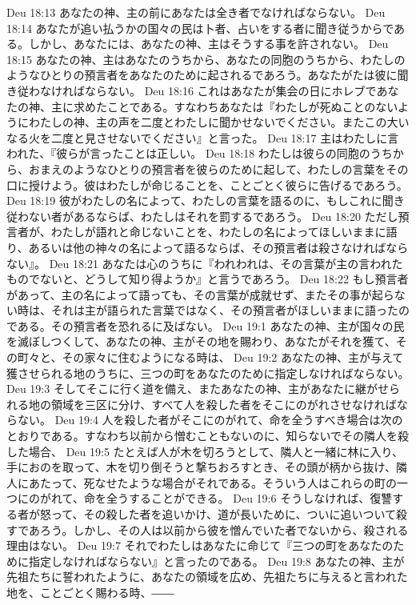 Deu 18:13  あなたの神、主の前にあなたは全き者でなければならない。
Deu 18:14  あなたが追い払うかの国々の民は卜者、占いをする者に聞き従うからである。しかし、あなたには、あなたの神、主はそうする事を許されない。
Deu 18:15  あなたの神、主はあなたのうちから、あなたの同胞のうちから、わたしのようなひとりの預言者をあなたのために起されるであろう。あなたがたは彼に聞き従わなければならない。
Deu 18:16  これはあなたが集会の日にホレブであなたの神、主に求めたことである。すなわちあなたは『わたしが死ぬことのないようにわたしの神、主の声を二度とわたしに聞かせないでください。またこの大いなる火を二度と見させないでください』と言った。
Deu 18:17  主はわたしに言われた、『彼らが言ったことは正しい。
Deu 18:18  わたしは彼らの同胞のうちから、おまえのようなひとりの預言者を彼らのために起して、わたしの言葉をその口に授けよう。彼はわたしが命じることを、ことごとく彼らに告げるであろう。
Deu 18:19  彼がわたしの名によって、わたしの言葉を語るのに、もしこれに聞き従わない者があるならば、わたしはそれを罰するであろう。
Deu 18:20  ただし預言者が、わたしが語れと命じないことを、わたしの名によってほしいままに語り、あるいは他の神々の名によって語るならば、その預言者は殺さなければならない』。
Deu 18:21  あなたは心のうちに『われわれは、その言葉が主の言われたものでないと、どうして知り得ようか』と言うであろう。
Deu 18:22  もし預言者があって、主の名によって語っても、その言葉が成就せず、またその事が起らない時は、それは主が語られた言葉ではなく、その預言者がほしいままに語ったのである。その預言者を恐れるに及ばない。
Deu 19:1  あなたの神、主が国々の民を滅ぼしつくして、あなたの神、主がその地を賜わり、あなたがそれを獲て、その町々と、その家々に住むようになる時は、
Deu 19:2  あなたの神、主が与えて獲させられる地のうちに、三つの町をあなたのために指定しなければならない。
Deu 19:3  そしてそこに行く道を備え、またあなたの神、主があなたに継がせられる地の領域を三区に分け、すべて人を殺した者をそこにのがれさせなければならない。
Deu 19:4  人を殺した者がそこにのがれて、命を全うすべき場合は次のとおりである。すなわち以前から憎むこともないのに、知らないでその隣人を殺した場合、
Deu 19:5  たとえば人が木を切ろうとして、隣人と一緒に林に入り、手におのを取って、木を切り倒そうと撃ちおろすとき、その頭が柄から抜け、隣人にあたって、死なせたような場合がそれである。そういう人はこれらの町の一つにのがれて、命を全うすることができる。
Deu 19:6  そうしなければ、復讐する者が怒って、その殺した者を追いかけ、道が長いために、ついに追いついて殺すであろう。しかし、その人は以前から彼を憎んでいた者でないから、殺される理由はない。
Deu 19:7  それでわたしはあなたに命じて『三つの町をあなたのために指定しなければならない』と言ったのである。
Deu 19:8  あなたの神、主が先祖たちに誓われたように、あなたの領域を広め、先祖たちに与えると言われた地を、ことごとく賜わる時、――
